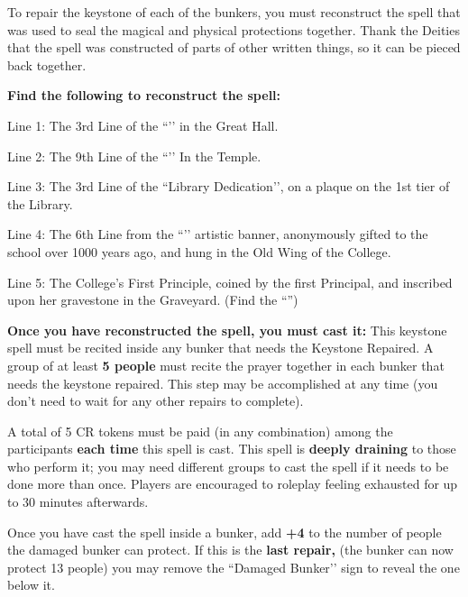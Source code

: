 \documentclass[green]{GL2020}
\begin{document}
\name{\gMagicalLayer{}}

To repair the keystone of each of the bunkers, you must reconstruct the spell that was used to seal the magical and physical protections together. Thank the Deities that the spell was constructed of parts of other written things, so it can be pieced back together.

\textbf{Find the following to reconstruct the spell:}

Line 1: The 3rd Line of the ``\sTeachersOath{}’’ in the Great Hall.\\
\vspace{1.5cm}

Line 2: The 9th Line of the ``\sAppeal{}’’ In the Temple.\\
\vspace{1.5cm}

Line 3: The 3rd Line of the ``Library Dedication’’, on a plaque on the 1st tier of the Library.\\
\vspace{1.5cm}

Line 4: The 6th Line from the ``\sBlackCrocusWishOne{}’’ artistic banner, anonymously gifted to the school over 1000 years ago, and hung in the Old Wing of the College.\\
\vspace{1.5cm}

Line 5: The College’s First Principle, coined by the first Principal, and inscribed upon her gravestone in the Graveyard. (Find the ``\sTombOfFirstPrincipal{}'')\\
\vspace{1.5cm}

\textbf{Once you have reconstructed the spell, you must cast it:}
This keystone spell must be recited inside any bunker that needs the Keystone Repaired. A group of at least \textbf{5 people} must recite the prayer together in each bunker that needs the keystone repaired. This step may be accomplished at any time (you don’t need to wait for any other repairs to complete). 

A total of 5 CR tokens must be paid (in any combination) among the participants \textbf{each time} this spell is cast. This spell is \textbf{deeply draining} to those who perform it; you may need different groups to cast the spell if it needs to be done more than once. Players are encouraged to roleplay feeling exhausted for up to 30 minutes afterwards.

Once you have cast the spell inside a bunker, add \textbf{+4} to the number of people the damaged bunker can protect. If this is the \textbf{last repair,} (the bunker can now protect 13 people) you may remove the ``Damaged Bunker’’ sign to reveal the one below it.
\end{document}
